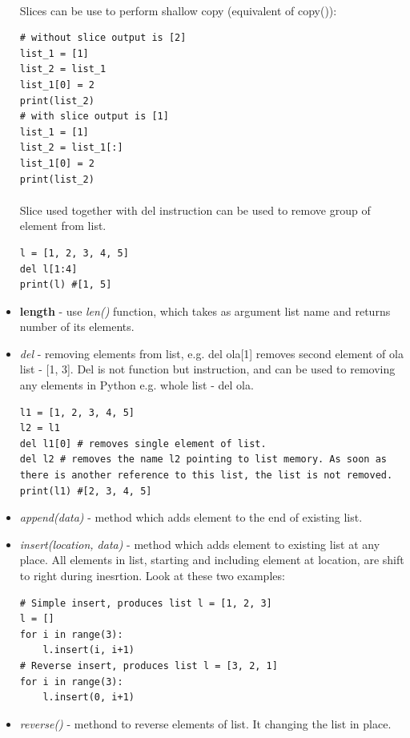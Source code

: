 \documentclass{article}
\begin{document}
\begin{itemize}
	\paragraph{}
	Slices can be use to perform shallow copy (equivalent of copy()): 
	\begin{lstlisting}[style=pystyle]
# without slice output is [2]
list_1 = [1]
list_2 = list_1
list_1[0] = 2
print(list_2)
# with slice output is [1]
list_1 = [1]
list_2 = list_1[:]
list_1[0] = 2
print(list_2)
	\end{lstlisting}
	\paragraph{}
	Slice used together with del instruction can be used to remove group of element from list.
	\begin{lstlisting}[style=pystyle]
l = [1, 2, 3, 4, 5]
del l[1:4]
print(l) #[1, 5]
	\end{lstlisting}
	\item \textbf{length} - use \textit{len()} function, which takes as argument list name and returns number of its elements.
	\item \textit{del} - removing elements from list, e.g. del ola[1] removes second element of ola list - [1, 3]. Del is not function but instruction, and can be used to removing any elements in Python e.g. whole list - del ola.
	\begin{lstlisting}[style=pystyle]
l1 = [1, 2, 3, 4, 5]
l2 = l1
del l1[0] # removes single element of list.
del l2 # removes the name l2 pointing to list memory. As soon as there is another reference to this list, the list is not removed.
print(l1) #[2, 3, 4, 5]
	\end{lstlisting}
	\item \textit{append(data)} - method which adds element to the end of existing list.
	\item \textit{insert(location, data)} - method which adds element to existing list at any place. All elements in list, starting and including element at location, are shift to right during inesrtion. Look at these two examples:
	\begin{lstlisting}[style=pystyle]
# Simple insert, produces list l = [1, 2, 3]
l = []
for i in range(3):
	l.insert(i, i+1)
# Reverse insert, produces list l = [3, 2, 1]
for i in range(3):
	l.insert(0, i+1)
	\end{lstlisting}
	\item \textit{reverse()} - methond to reverse elements of list.	It changing the list in place.

\end{itemize}
\end{document}
